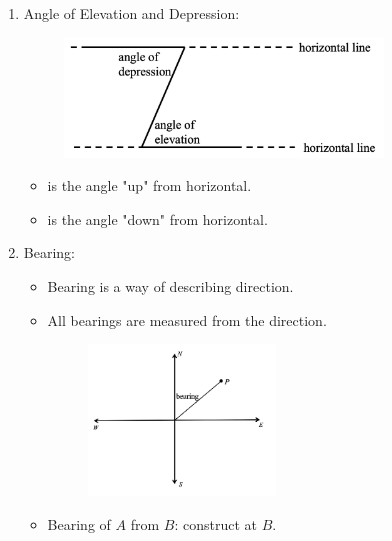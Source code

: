 \documentclass[12pt, a4paper]{article}
\begin{document}
\begin{enumerate}
  \item Angle of Elevation and Depression: 
  \begin{myclaim}{ }{}
    \begin{figure}[H]
      \centering
      \includegraphics[width=0.8\textwidth]{Fig.3.20.jpg}
    \end{figure}
    \begin{itemize}
    \item \textbf{\color{red}{Angle of Elevation}} is the angle "up" from horizontal. 
    \item \textbf{\color{red}{Angle of Depression}} is the angle "down" from horizontal. 
    \end{itemize}
  \end{myclaim}
  \item Bearing: 
  \begin{itemize}
    \item Bearing is a way of describing direction. 
    \item All bearings are measured {\color{red}{clockwise}} from the {\color{red}{North}} direction. 
    \begin{figure}[H]
      \centering
      \includegraphics[width=0.5\textwidth]{Fig.3.21.jpg}
    \end{figure}
  \item Bearing of $A$ from $B$: construct at $B$.\\
  {\color{green}{N.B.: Bearing of $A$ from $B$ is different from bearing of $B$ from $A$.}}
  \end{itemize}
\end{enumerate}
\end{document}
